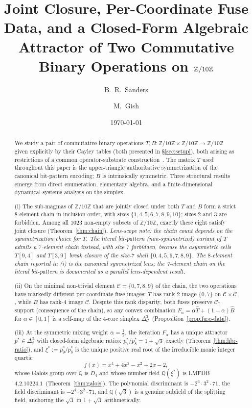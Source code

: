 \documentclass[11pt,reqno]{amsart}
\title[Joint closure on $\Zten$]{Joint Closure, Per-Coordinate Fuse
Data, and a Closed-Form Algebraic Attractor of Two Commutative Binary
Operations on $\Zten$}
\author{B.~R.~Sanders}
\author{M.~Gish}
\date{\today}
\theoremstyle{plain}
\theoremstyle{definition}
\theoremstyle{remark}
\newcommand{\Z}{\mathbb{Z}}
\newcommand{\Q}{\mathbb{Q}}
\newcommand{\Zten}{\Z/10\Z}
\newcommand{\Cfour}{\mathcal{C}}
\newcommand{\Tfuse}{\widehat{T}}
\newcommand{\Bfuse}{\widehat{B}}
\begin{document}
\begin{abstract}
We study a pair of commutative binary operations
$T,B:\Zten\times\Zten\to\Zten$ given explicitly by their Cayley
tables (both presented in \S\ref{sec:setup}), both arising as restrictions of a common operator-substrate
construction~\cite{SandersGish2026Sigma}. The matrix $T$ used throughout this paper is the upper-triangle authoritative symmetrization of the canonical bit-pattern encoding; $B$ is intrinsically symmetric. Three structural results
emerge from direct enumeration, elementary algebra, and a
finite-dimensional dynamical-systems analysis on the simplex.

(i) The sub-magmas of $\Zten$ that are jointly closed under both
$T$ and $B$ form a strict $8$-element chain in inclusion order,
with sizes $\{1, 4, 5, 6, 7, 8, 9, 10\}$; sizes $2$ and $3$ are
forbidden. Among all $1023$ non-empty subsets of $\Zten$, exactly
these eight satisfy joint closure (Theorem~\ref{thm:chain}). \emph{Lens-scope note: the chain count depends on the symmetrization choice for $T$. The literal bit-pattern (non-symmetrized) variant of $T$ admits a $7$-element chain instead, with size $7$ forbidden, because the asymmetric cells $T[9,4]$ and $T[3,9]$ break closure of the size-$7$ shell $\{0,4,5,6,7,8,9\}$. The $8$-element chain reported in (i) is the canonical symmetrized lens; the 7-element chain on the literal bit-pattern is documented as a parallel lens-dependent result.}

(ii) On the minimal non-trivial element $\Cfour=\{0,7,8,9\}$ of
the chain, the two operations have markedly different
per-coordinate fuse images: $T$ has rank-$2$ image $\{0, 7\}$ on
$\Cfour\times\Cfour$, while $B$ has rank-$4$ image $\Cfour$.
Despite this rank disparity, both fuses preserve $\Cfour$-support
(consequence of the chain), so any convex combination
$F_\alpha = \alpha\Tfuse + (1-\alpha)\Bfuse$ for $\alpha\in[0,1]$
is a self-map of the $4$-core simplex
$\Delta^{3}_{\Cfour}$~(Proposition~\ref{prop:fuse-data}).

(iii) At the symmetric mixing weight $\alpha=\tfrac12$, the
iteration $F_\alpha$ has a unique attractor
$p^*\in\Delta^{3}_{\Cfour}$ with closed-form algebraic ratios:
$p^*_{7}/p^*_{8}=1+\sqrt{3}$ exactly
(Theorem~\ref{thm:hbr-ratio}), and $\xi^*:=p^*_{9}/p^*_{8}$ is
the unique positive real root of the irreducible monic integer
quartic
\[
  f(x) = x^{4}+4x^{3}-x^{2}+2x-2,
\]
whose Galois group over $\Q$ is $D_{4}$ and whose number field
$\Q(\xi^*)$ is LMFDB~$4.2.10224.1$~(Theorem~\ref{thm:galois}).
The polynomial discriminant is
$-2^{6}\cdot 3^{2}\cdot 71$, the field discriminant is
$-2^{4}\cdot 3^{2}\cdot 71$, and $\Q(\sqrt{3})$ is a genuine
subfield of the splitting field, anchoring the $\sqrt{3}$ in
$1+\sqrt{3}$ arithmetically.


\end{abstract}
\end{document}
